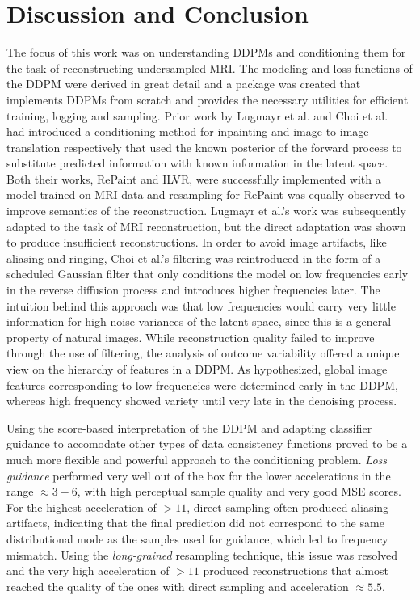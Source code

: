 %
\newpage
\chapter{Discussion and Conclusion}
The focus of this work was on understanding DDPMs and conditioning them for the task of reconstructing undersampled MRI. The modeling and loss functions of the DDPM were derived in great detail and a package was created that implements DDPMs from scratch and provides the necessary utilities for efficient training, logging and sampling. Prior work by Lugmayr et al. and Choi et al.~\autocite{lugmayr2022repaint,choi2021ilvr} had introduced a conditioning method for inpainting and image-to-image translation respectively that used the known posterior of the forward process to substitute predicted information with known information in the latent space. Both their works, RePaint and ILVR, were successfully implemented with a model trained on MRI data and resampling for RePaint was equally observed to improve semantics of the reconstruction. Lugmayr et al.'s work was subsequently adapted to the task of MRI reconstruction, but the direct adaptation was shown to produce insufficient reconstructions. In order to avoid image artifacts, like aliasing and ringing, Choi et al.'s filtering was reintroduced in the form of a scheduled Gaussian filter that only conditions the model on low frequencies early in the reverse diffusion process and introduces higher frequencies later. The intuition behind this approach was that low frequencies would carry very little information for high noise variances of the latent space, since this is a general property of natural images. While reconstruction quality failed to improve through the use of filtering, the analysis of outcome variability offered a unique view on the hierarchy of features in a DDPM. As hypothesized, global image features corresponding to low frequencies were determined early in the DDPM, whereas high frequency showed variety until very late in the denoising process.

Using the score-based interpretation of the DDPM and adapting classifier guidance to accomodate other types of data consistency functions proved to be a much more flexible and powerful approach to the conditioning problem. \textit{Loss guidance} performed very well out of the box for the lower accelerations in the range $\approx 3-6$, with high perceptual sample quality and very good MSE scores. For the highest acceleration of $>11$, direct sampling often produced aliasing artifacts, indicating that the final prediction did not correspond to the same distributional mode as the samples used for guidance, which led to frequency mismatch. Using the \textit{long-grained} resampling technique, this issue was resolved and the very high acceleration of $>11$ produced reconstructions that almost reached the quality of the ones with direct sampling and acceleration $\approx 5.5$.

